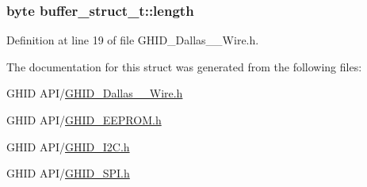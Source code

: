 \hypertarget{structbuffer__struct__t_a812251f18d1b5b93fed46984ed8d7cf1}{
\subsubsection[{length}]{\setlength{\rightskip}{0pt plus 5cm}byte {\bf buffer\-\_\-struct\-\_\-t\-::length}}}\label{structbuffer__struct__t_a812251f18d1b5b93fed46984ed8d7cf1}


\-Definition at line 19 of file \-G\-H\-I\-D\-\_\-\-Dallas\-\_\-\_\-\-Wire.\-h.



\-The documentation for this struct was generated from the following files\-:\begin{DoxyCompactItemize}
\item 
\-G\-H\-I\-D A\-P\-I/\hyperlink{_g_h_i_d___dallas__1___wire_8h}{\-G\-H\-I\-D\-\_\-\-Dallas\-\_\-\_\-\-Wire.\-h}\item 
\-G\-H\-I\-D A\-P\-I/\hyperlink{_g_h_i_d___e_e_p_r_o_m_8h}{\-G\-H\-I\-D\-\_\-\-E\-E\-P\-R\-O\-M.\-h}\item 
\-G\-H\-I\-D A\-P\-I/\hyperlink{_g_h_i_d___i2_c_8h}{\-G\-H\-I\-D\-\_\-\-I2\-C.\-h}\item 
\-G\-H\-I\-D A\-P\-I/\hyperlink{_g_h_i_d___s_p_i_8h}{\-G\-H\-I\-D\-\_\-\-S\-P\-I.\-h}\end{DoxyCompactItemize}
